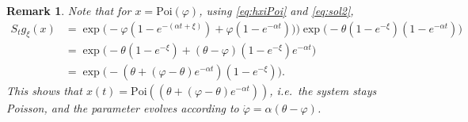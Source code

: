 \documentclass{imsart}
\theoremstyle{plain}
\newtheorem{remark}[theorem]{Remark}
\theoremstyle{definition}
\begin{document}
\begin{remark}
    Note that for $x = \text{Poi}(\varphi)$, using \eqref{eq:hxiPoi}  and \eqref{eq:sol2},
    \begin{align*}
        S_tg_{ \xi}(x) & = \exp\Big(-\varphi(1 - e^{-(\alpha t + \xi)}) + \varphi(1 - e^{-\alpha t})) \Big) \exp\Big(-\theta(1-e^{-\xi})(1-e^{-\alpha t})\Big) \\ & = \exp\Big( - \theta(1 - e^{-\xi}) + ( \theta - \varphi)(1 - e^{-\xi})e^{-\alpha t}  \Big) \\ & = \exp\Big( - (\theta + (\varphi - \theta) e^{-\alpha t}) (1 - e^{-\xi})\Big).
    \end{align*}
    This shows that $x(t) = \text{Poi}((\theta + (\varphi - \theta) e^{-\alpha t}))$, i.e.\ the system stays Poisson, and the parameter evolves according to $\dot \varphi = \alpha (\theta - \varphi)$.
\end{remark}
\end{document}
